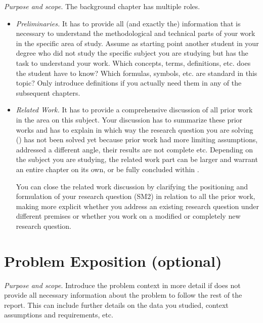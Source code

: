 \emph{Purpose and scope}.
The background chapter has multiple roles.
\begin{itemize}

  \item \emph{Preliminaries.}
        It has to provide all (and exactly the) information that is necessary to understand the methodological and technical parts of your work in the specific area of study.
        Assume as starting point another student in your degree who did not study the specific subject you are studying but has the task to understand your work.
        Which concepts, terms, definitions, etc. does the student have to know?
        Which formulas, symbols, etc. are standard in this topic?
        Only introduce definitions if you actually need them in any of the subsequent chapters.

  \item \emph{Related Work.}
        It has to provide a comprehensive discussion of all prior work in the area on this subject.
        Your discussion has to summarize these prior works and has to explain in which way the research question you are solving () has not been solved yet because prior work had more limiting assumptions, addressed a different angle, their results are not complete etc. Depending on the subject you are studying, the related work part can be larger and warrant an entire chapter on its own, or be fully concluded within .

        You can close the related work discussion by clarifying the positioning and formulation of your research question (SM2) in relation to all the prior work, making more explicit whether you address an existing research question under different premises or whether you work on a modified or completely new research question.
\end{itemize}

\section{Problem Exposition (optional)}\label{sec:problem-exposition}

\emph{Purpose and scope}.
Introduce the problem context in more detail if  does not provide all necessary information about the problem to follow the rest of the report.
This can include further details on the data you studied, context assumptions and requirements, etc.

